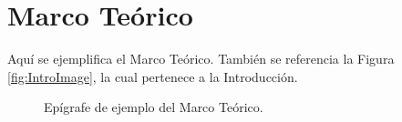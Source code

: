   \section{Marco Teórico}

  Aquí se ejemplifica el Marco Teórico. También se referencia la Figura \ref{fig:IntroImage}, la cual pertenece a la Introducción.

    \begin{figure}[ht]
      \centering
      \caption{Epígrafe de ejemplo del Marco Teórico.}
      \label{fig:MarcTeoImage}
  \end{figure}

